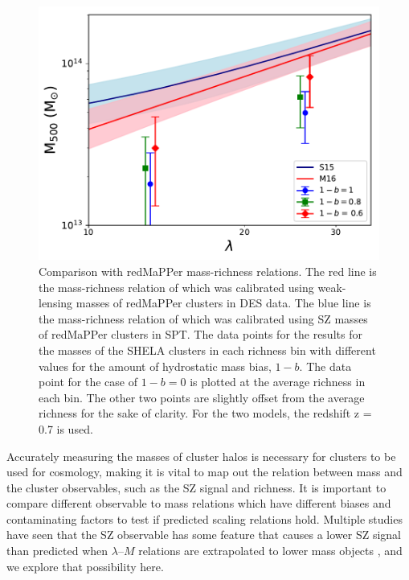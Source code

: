 \documentclass[a4paper,fleqn,usenatbib]{mnras}
\begin{document}
\begin{figure}
  \centering
    \includegraphics[width=\columnwidth] {M500_lambda_shela_sptvsrm.pdf}
  \caption{Comparison with redMaPPer mass-richness relations. The red line is the mass-richness relation of \protect \cite{2016arXiv161006890M} which was calibrated using weak-lensing masses of redMaPPer clusters in DES data. The blue line is the mass-richness relation of \protect \cite{2015MNRAS.454.2305S} which was calibrated using SZ masses of redMaPPer clusters in SPT. The data points for the results for the masses of the SHELA clusters in each richness bin with different values for the amount of hydrostatic mass bias, $1-b$. The data point for the case of $1-b=0$ is plotted at the average richness in each bin. The other two points are slightly offset from the average richness for the sake of clarity. For the two models, the redshift z = 0.7 is used.}
  \label{fig:y500vslambda}
\end{figure}


Accurately measuring the masses of cluster halos is necessary for clusters to be used for cosmology, making it is vital to map out the relation between mass and the cluster observables, such as the SZ signal and richness. It is important to compare different observable to mass relations which have different biases and contaminating factors to test if predicted scaling relations hold. Multiple studies have seen that the SZ observable has some feature that causes a lower SZ signal than predicted when $\lambda$--$M$ relations are extrapolated to lower mass objects \citep{2011A&A...536A..12P,2012PhRvD..85b3005D,2013ApJ...767...38S,2016arXiv160508770S}, and we explore that possibility here.  
\end{document}
